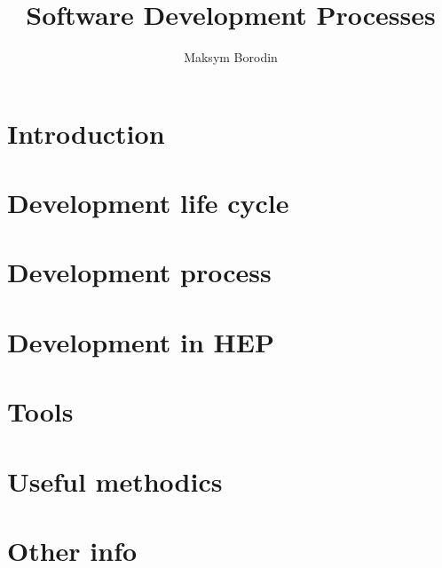\documentclass{beamer}
\title{Software Development Processes}
\author{Maksym Borodin}
\begin{document}
\frame{\titlepage}

\section{Introduction}


\section{Development life cycle}


\section{Development process}


\section{Development in HEP}


\section{Tools}


\section{Useful methodics}


\section{Other info}

\end{document}
